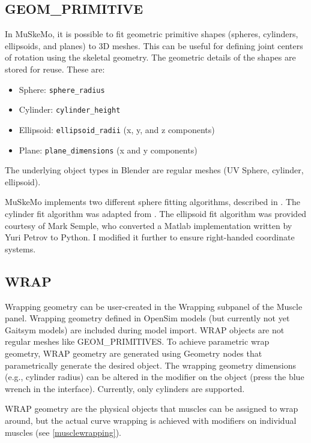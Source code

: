 \documentclass{article}
\begin{document}
\subsection{GEOM\_PRIMITIVE}

In MuSkeMo, it is possible to fit geometric primitive shapes (spheres, cylinders, ellipsoids, and planes) to 3D meshes. This can be useful for defining joint centers of rotation using the skeletal geometry. The geometric details of the shapes are stored for reuse. These are:

\begin{itemize}
    \item Sphere: \texttt{sphere\_radius}
    \item Cylinder: \texttt{cylinder\_height}
    \item Ellipsoid: \texttt{ellipsoid\_radii} (x, y, and z components)
    \item Plane: \texttt{plane\_dimensions} (x and y components)
\end{itemize}

The underlying object types in Blender are regular meshes (UV Sphere, cylinder, ellipsoid).

MuSkeMo implements two different sphere fitting algorithms, described in \cite{Jekel2016, yesudasanFastGeometricFit2015}. The cylinder fit algorithm was adapted from \cite{eberlyLeastSquaresFitting}. The ellipsoid fit algorithm \cite{semplePyEllipsoid_Fit} was provided courtesy of Mark Semple, who converted a Matlab implementation written by Yuri Petrov to Python. I modified it further to ensure right-handed coordinate systems.

\subsection{WRAP}
\label{sec:wrapgeom}

Wrapping geometry can be user-created in the Wrapping subpanel of the Muscle panel. Wrapping geometry defined in OpenSim models (but currently not yet Gaitsym models) are included during model import. WRAP objects are not regular meshes like GEOM\_PRIMITIVES. To achieve parametric wrap geometry, WRAP geometry are generated using Geometry nodes that parametrically generate the desired object. The wrapping geometry dimensions (e.g., cylinder radius) can be altered in the modifier on the object (press the blue wrench in the interface). Currently, only cylinders are supported.

WRAP geometry are the physical objects that muscles can be assigned to wrap around, but the actual curve wrapping is achieved with modifiers on individual muscles (see \ref{musclewrapping}).
\end{document}
